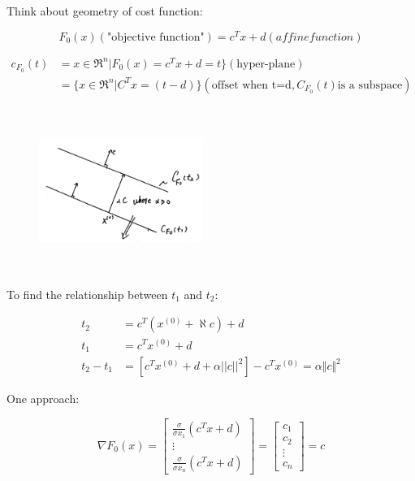 Think about geometry of cost function:

\begin{equation*}
F_0(x)(\text{"objective function"}) =c^Tx + d(affine function)
\end{equation*}

\begin{align*}
c_{F_0}(t) &= x\in \Re^n | F_0(x) = c^Tx + d = t \}(\text{hyper-plane})\\
&= \{x\in \Re^n | C^Tx = (t-d) \}(\text{offset when t=d}, C_{F_0}(t) \text{is a subspace})
\end{align*}

\begin{figure}
	\centering
	\includegraphics[width=2.1in,height=2.1in]{figures/ch07/figure1012_1.png}
\end{figure}

To find the relationship between $t_1$ and $t_2$:

\begin{align*}
t_2 &= c^T(x^{(0)}+\aleph c) + d\\
t_1 &= c^Tx^{(0)} + d\\
t_2 - t_1 &= [c^Tx^{(0)} + d + \alpha ||c||^2] - c^Tx^{(0)} = \alpha \Vert c \Vert^2
\end{align*}

One approach:


\begin{equation*}
\nabla F_0(x) =
	\begin{bmatrix}
	\frac{\sigma}{\sigma x_1}(c^Tx+d)\\
	\vdots\\
	\frac{\sigma}{\sigma x_n}(c^Tx+d)
	\end{bmatrix} = 
	\begin{bmatrix}
	c_1\\
	c_2\\
	\vdots\\
	c_n
	\end{bmatrix} = c
\end{equation*}

